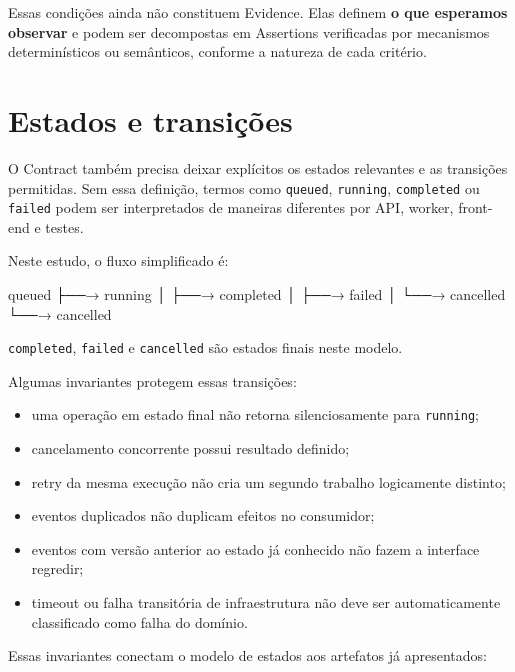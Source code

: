 \documentclass[
  10pt,
  a4paper,
  oneside]{book}
\newenvironment{Shaded}{}{}
\newcommand{\NormalTok}[1]{#1}
\providecommand{\tightlist}{%
  \setlength{\itemsep}{0pt}\setlength{\parskip}{0pt}}
\renewenvironment{Shaded}{\begin{snugshade}}{\end{snugshade}}%
\begin{document}
Essas condições ainda não constituem Evidence. Elas definem \textbf{o
que esperamos observar} e podem ser decompostas em Assertions
verificadas por mecanismos determinísticos ou semânticos, conforme a
natureza de cada critério.

\hypertarget{estados-e-transiuxe7uxf5es}{%
\section{Estados e transições}\label{estados-e-transiuxe7uxf5es}}

O Contract também precisa deixar explícitos os estados relevantes e as
transições permitidas. Sem essa definição, termos como \texttt{queued},
\texttt{running}, \texttt{completed} ou \texttt{failed} podem ser
interpretados de maneiras diferentes por API, worker, front-end e
testes.

Neste estudo, o fluxo simplificado é:

\begin{Shaded}
\begin{Highlighting}[]
\NormalTok{queued}
\NormalTok{  ├──→ running}
\NormalTok{  │      ├──→ completed}
\NormalTok{  │      ├──→ failed}
\NormalTok{  │      └──→ cancelled}
\NormalTok{  └──→ cancelled}
\end{Highlighting}
\end{Shaded}

\texttt{completed}, \texttt{failed} e \texttt{cancelled} são estados
finais neste modelo.

Algumas invariantes protegem essas transições:

\begin{itemize}
\tightlist
\item
  uma operação em estado final não retorna silenciosamente para
  \texttt{running};
\item
  cancelamento concorrente possui resultado definido;
\item
  retry da mesma execução não cria um segundo trabalho logicamente
  distinto;
\item
  eventos duplicados não duplicam efeitos no consumidor;
\item
  eventos com versão anterior ao estado já conhecido não fazem a
  interface regredir;
\item
  timeout ou falha transitória de infraestrutura não deve ser
  automaticamente classificado como falha do domínio.
\end{itemize}

Essas invariantes conectam o modelo de estados aos artefatos já
apresentados:
\end{document}
